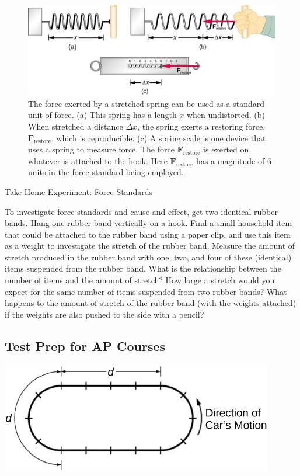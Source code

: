 \documentclass[
]{book}
\begin{document}
\begin{figure}
\hypertarget{import-auto-id2608835}{%
\centering
\includegraphics{images/Figure_04_01_02.jpg}
\caption{The force exerted by a stretched spring can be used as a standard unit
of force. (a) This spring has a length \(x{}\) when undistorted. (b) When
stretched a distance \({\Delta x}{}\), the spring exerts a restoring
force, \(\textbf{F}_{\text{restore}}{}\), which is reproducible. (c) A
spring scale is one device that uses a spring to measure force. The
force \(\textbf{F}_{\text{restore}}{}\) is exerted on whatever is attached
to the hook. Here \(\textbf{F}_{\text{restore}}{}\) has a magnitude of 6
units in the force standard being
employed.}\label{import-auto-id2608835}
}
\end{figure}

\hypertarget{fs-id2631420}{}
Take-Home Experiment: Force Standards

To investigate force standards and cause and effect, get two identical
rubber bands. Hang one rubber band vertically on a hook. Find a small
household item that could be attached to the rubber band using a paper
clip, and use this item as a weight to investigate the stretch of the
rubber band. Measure the amount of stretch produced in the rubber band
with one, two, and four of these (identical) items suspended from the
rubber band. What is the relationship between the number of items and
the amount of stretch? How large a stretch would you expect for the same
number of items suspended from two rubber bands? What happens to the
amount of stretch of the rubber band (with the weights attached) if the
weights are also pushed to the side with a pencil?

\hypertarget{fs-id1798867}{}
\hypertarget{test-prep-for-ap-courses-9}{%
\subsection{Test Prep for AP Courses}\label{test-prep-for-ap-courses-9}}

\hypertarget{fs-id1691415}{}
\leavevmode{}%
\includegraphics{images/Figure_04_01_03.jpg}
\end{document}
